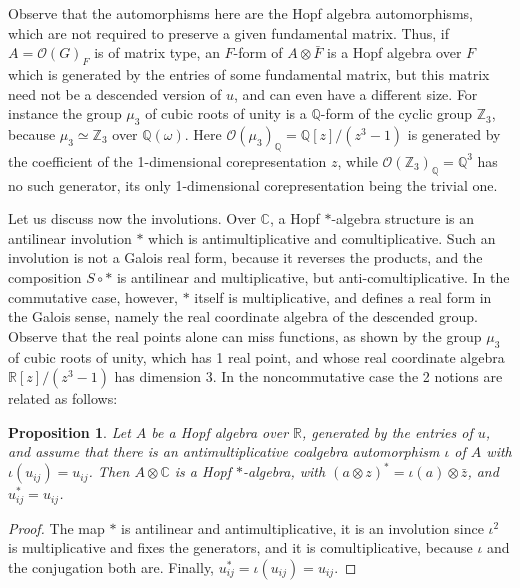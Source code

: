 \documentclass[11pt]{amsart}
\newtheorem{proposition}[theorem]{Proposition}
\theoremstyle{definition}
\begin{document}
Observe that the automorphisms here are the Hopf algebra automorphisms, which are not required to preserve a given fundamental matrix. Thus, if $A=\mathcal O(G)_F$ is of matrix type, an $F$-form of $A\otimes\bar F$ is a Hopf algebra over $F$ which is generated by the entries of some fundamental matrix, but this matrix need not be a descended version of $u$, and can even have a different size. For instance the group $\mu_3$ of cubic roots of unity is a $\mathbb Q$-form of the cyclic group $\mathbb Z_3$, because $\mu_3\simeq\mathbb Z_3$ over $\mathbb Q(\omega)$. Here $\mathcal O(\mu_3)_{\mathbb Q}=\mathbb Q[z]/(z^3-1)$ is generated by the coefficient of the 1-dimensional corepresentation $z$, while $\mathcal O(\mathbb Z_3)_{\mathbb Q}=\mathbb Q^3$ has no such generator, its only 1-dimensional corepresentation being the trivial one.

Let us discuss now the involutions. Over $\mathbb C$, a Hopf $*$-algebra structure is an antilinear involution $*$ which is antimultiplicative and comultiplicative. Such an involution is not a Galois real form, because it reverses the products, and the composition $S\circ*$ is antilinear and multiplicative, but anti-comultiplicative. In the commutative case, however, $*$ itself is multiplicative, and defines a real form in the Galois sense, namely the real coordinate algebra of the descended group. Observe that the real points alone can miss functions, as shown by the group $\mu_3$ of cubic roots of unity, which has 1 real point, and whose real coordinate algebra $\mathbb R[z]/(z^3-1)$ has dimension 3. In the noncommutative case the 2 notions are related as follows:

\begin{proposition}
\label{p15}
Let $A$ be a Hopf algebra over $\mathbb R$, generated by the entries of $u$, and assume that there is an antimultiplicative coalgebra automorphism $\iota$ of $A$ with $\iota(u_{ij})=u_{ij}$. Then $A\otimes\mathbb C$ is a Hopf $*$-algebra, with $(a\otimes z)^*=\iota(a)\otimes\bar z$, and $u_{ij}^*=u_{ij}$.
\end{proposition}

\begin{proof}
The map $*$ is antilinear and antimultiplicative, it is an involution since $\iota^2$ is multiplicative and fixes the generators, and it is comultiplicative, because $\iota$ and the conjugation both are. Finally, $u_{ij}^*=\iota(u_{ij})=u_{ij}$.
\end{proof}
\end{document}
